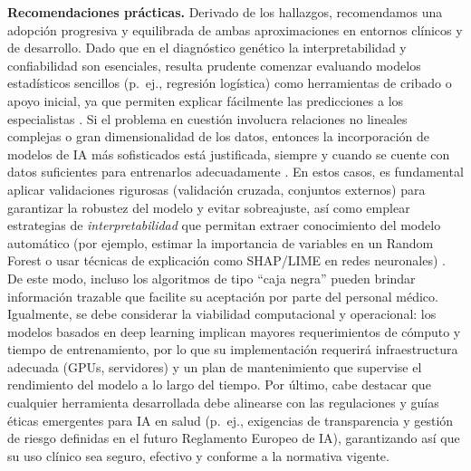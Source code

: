 \documentclass[11pt,a4paper,spanish]{book}
\numberwithin{equation}{chapter}
\numberwithin{figure}{chapter}
\begin{document}
\noindent \textbf{Recomendaciones prácticas.} Derivado de los hallazgos, recomendamos una adopción progresiva y equilibrada de ambas aproximaciones en entornos clínicos y de desarrollo. Dado que en el diagnóstico genético la interpretabilidad y confiabilidad son esenciales, resulta prudente comenzar evaluando modelos estadísticos sencillos (p.~ej., regresión logística) como herramientas de cribado o apoyo inicial, ya que permiten explicar fácilmente las predicciones a los especialistas \cite{10.1093/eurheartj/ehu207,rudin_2019}. Si el problema en cuestión involucra relaciones no lineales complejas o gran dimensionalidad de los datos, entonces la incorporación de modelos de IA más sofisticados está justificada, siempre y cuando se cuente con datos suficientes para entrenarlos adecuadamente \cite{Ching_2018,Libbrecht2015}. En estos casos, es fundamental aplicar validaciones rigurosas (validación cruzada, conjuntos externos) para garantizar la robustez del modelo y evitar sobreajuste, así como emplear estrategias de \textit{interpretabilidad} que permitan extraer conocimiento del modelo automático (por ejemplo, estimar la importancia de variables en un Random Forest o usar técnicas de explicación como SHAP/LIME en redes neuronales) \cite{rudin_2019}. De este modo, incluso los algoritmos de tipo ``caja negra'' pueden brindar información trazable que facilite su aceptación por parte del personal médico. Igualmente, se debe considerar la viabilidad computacional y operacional: los modelos basados en deep learning implican mayores requerimientos de cómputo y tiempo de entrenamiento, por lo que su implementación requerirá infraestructura adecuada (GPUs, servidores) y un plan de mantenimiento que supervise el rendimiento del modelo a lo largo del tiempo. Por último, cabe destacar que cualquier herramienta desarrollada debe alinearse con las regulaciones y guías éticas emergentes para IA en salud (p.~ej., exigencias de transparencia y gestión de riesgo definidas en el futuro Reglamento Europeo de IA), garantizando así que su uso clínico sea seguro, efectivo y conforme a la normativa vigente.
\end{document}
